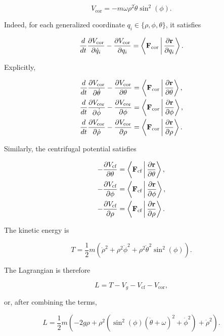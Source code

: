 \documentclass[12pt]{article}
\begin{document}
\[
V_{\mathrm{cor}}
=
-m\omega\rho^2\dot\theta\sin^2(\phi).
\]

Indeed, for each generalized coordinate
$q_i\in\{\rho,\phi,\theta\}$, it satisfies

\[
\frac{d}{dt}
\frac{\partial V_{\mathrm{cor}}}{\partial\dot q_i}
-
\frac{\partial V_{\mathrm{cor}}}{\partial q_i}
=
\left\langle
\vb F_{\mathrm{cor}}
\,\middle|\,
\frac{\partial\vb r}{\partial q_i}
\right\rangle.
\]

Explicitly,

\begin{align}
  \frac{d}{dt}\frac{\partial V_\text{cor}}{\partial\dot\theta}
    - \frac{\partial V_\text{cor}}{\partial\theta}
    &= \left\langle\vb{F}_\text{cor}\,\middle|\,\frac{\partial\vb{r}}{\partial\theta}\right\rangle, \\
  \frac{d}{dt}\frac{\partial V_\text{cor}}{\partial\dot\phi}
    - \frac{\partial V_\text{cor}}{\partial\phi}
    &= \left\langle\vb{F}_\text{cor}\,\middle|\,\frac{\partial\vb{r}}{\partial\phi}\right\rangle, \\
  \frac{d}{dt}\frac{\partial V_\text{cor}}{\partial\dot\rho}
    - \frac{\partial V_\text{cor}}{\partial\rho}
    &= \left\langle\vb{F}_\text{cor}\,\middle|\,\frac{\partial\vb{r}}{\partial\rho}\right\rangle.
\end{align}

Similarly, the centrifugal potential satisfies

\begin{align}
  -\frac{\partial V_\text{cf}}{\partial\theta}
    &= \left\langle\vb{F}_\text{cf}\,\middle|\,\frac{\partial\vb{r}}{\partial\theta}\right\rangle, \\
  -\frac{\partial V_\text{cf}}{\partial\phi}
    &= \left\langle\vb{F}_\text{cf}\,\middle|\,\frac{\partial\vb{r}}{\partial\phi}\right\rangle, \\
  -\frac{\partial V_\text{cf}}{\partial\rho}
    &= \left\langle\vb{F}_\text{cf}\,\middle|\,\frac{\partial\vb{r}}{\partial\rho}\right\rangle.
\end{align}

The kinetic energy is

\[
T
=
\frac{1}{2}m
\left(
\dot\rho^2
+
\rho^2\dot\phi^2
+
\rho^2\dot\theta^2\sin^2(\phi)
\right).
\]

The Lagrangian is therefore

\[
L
=
T
-
V_g
-
V_{\mathrm{cf}}
-
V_{\mathrm{cor}},
\]

or, after combining the terms,

\[
L
=
\frac{1}{2}m
\left(
-2g\rho
+
\rho^2
\left(
\sin^2(\phi)(\dot\theta+\omega)^2
+
\dot\phi^2
\right)
+
\dot\rho^2
\right).
\]
\end{document}
